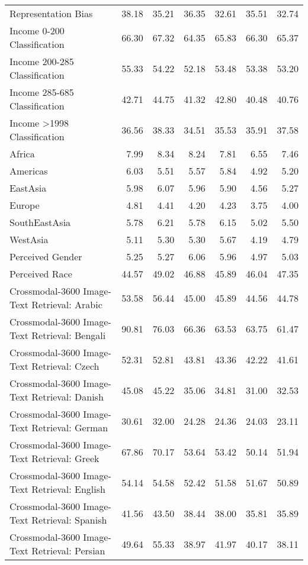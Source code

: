 {\begin{longtable}{l|rr|rr|rr}
Representation Bias & 38.18 & 35.21 & 36.35 & 32.61 & 35.51 & 32.74 \\
Income 0-200 Classification & 66.30 & 67.32 & 64.35 & 65.83 & 66.30 & 65.37 \\
Income 200-285 Classification & 55.33 & 54.22 & 52.18 & 53.48 & 53.38 & 53.20 \\
Income 285-685 Classification & 42.71 & 44.75 & 41.32 & 42.80 & 40.48 & 40.76 \\
Income \textgreater1998 Classification & 36.56 & 38.33 & 34.51 & 35.53 & 35.91 & 37.58 \\
Africa & 7.99 & 8.34 & 8.24 & 7.81 & 6.55 & 7.46 \\
Americas & 6.03 & 5.51 & 5.57 & 5.84 & 4.92 & 5.20 \\
EastAsia & 5.98 & 6.07 & 5.96 & 5.90 & 4.56 & 5.27 \\
Europe & 4.81 & 4.41 & 4.20 & 4.23 & 3.75 & 4.00 \\
SouthEastAsia & 5.78 & 6.21 & 5.78 & 6.15 & 5.02 & 5.50 \\
WestAsia & 5.11 & 5.30 & 5.30 & 5.67 & 4.19 & 4.79 \\
Perceived Gender & 5.25 & 5.27 & 6.06 & 5.96 & 4.97 & 5.03 \\
Perceived Race & 44.57 & 49.02 & 46.88 & 45.89 & 46.04 & 47.35 \\
Crossmodal-3600 Image-Text Retrieval: Arabic & 53.58 & 56.44 & 45.00 & 45.89 & 44.56 & 44.78 \\
Crossmodal-3600 Image-Text Retrieval: Bengali & 90.81 & 76.03 & 66.36 & 63.53 & 63.75 & 61.47 \\
Crossmodal-3600 Image-Text Retrieval: Czech & 52.31 & 52.81 & 43.81 & 43.36 & 42.22 & 41.61 \\
Crossmodal-3600 Image-Text Retrieval: Danish & 45.08 & 45.22 & 35.06 & 34.81 & 31.00 & 32.53 \\
Crossmodal-3600 Image-Text Retrieval: German & 30.61 & 32.00 & 24.28 & 24.36 & 24.03 & 23.11 \\
Crossmodal-3600 Image-Text Retrieval: Greek & 67.86 & 70.17 & 53.64 & 53.42 & 50.14 & 51.94 \\
Crossmodal-3600 Image-Text Retrieval: English & 54.14 & 54.58 & 52.42 & 51.58 & 51.67 & 50.89 \\
Crossmodal-3600 Image-Text Retrieval: Spanish & 41.56 & 43.50 & 38.44 & 38.00 & 35.81 & 35.89 \\
Crossmodal-3600 Image-Text Retrieval: Persian & 49.64 & 55.33 & 38.97 & 41.97 & 40.17 & 38.11 \\

\end{longtable}}
